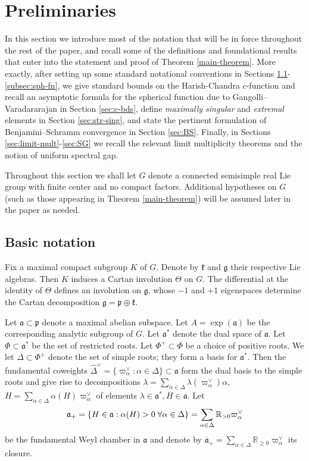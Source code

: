\documentclass[12pt]{amsart}
\theoremstyle{remark}
\newcommand{\R}{\mathbb R}
\newcommand{\g}{\mathfrak g}
\newcommand{\ga}{\mathfrak a}
\begin{document}
\section{Preliminaries}\label{sec:preliminaries}
In this section we introduce most of the notation that will be in force throughout the rest of the paper, and recall some of the definitions and foundational results that enter into the statement and proof of Theorem \ref{main-theorem}. More exactly, after setting up some standard notational conventions in Sections \ref{sec:basic}-\ref{subsec:sph-fn}, we give standard bounds on the Harish-Chandra $c$-function and recall an asymptotic formula for the spherical function due to Gangolli--Varadararajan in Section \ref{sec:c-bds}, define \textit{maximally singular} and \textit{extremal} elements in Section \ref{sec:str-sing}, and state the pertinent formulation of Benjamini--Schramm convergence in Section \ref{sec:BS}. Finally, in Sections \ref{sec:limit-mult}-\ref{sec:SG} we recall the relevant limit multiplicity theorems   and the notion of uniform spectral gap.

Throughout this section we shall let $G$ denote a connected semisimple real Lie group with finite center and no compact factors. Additional hypotheses on $G$ (such as those appearing in Theorem \ref{main-theorem}) will be assumed later in the paper as needed.

\subsection{Basic notation}\label{sec:basic}
Fix a maximal compact subgroup $K$ of $G$. Denote by $\mathfrak{k}$ and $\g$ their respective Lie algebras. Then $K$ induces a Cartan involution $\Theta$ on $G$. The differential at the identity of $\Theta$ defines an involution on $\g$, whose $-1$ and $+1$ eigenspaces determine the Cartan decomposition $\g=\mathfrak{p}\oplus\mathfrak{k}$.

Let $\mathfrak{a}\subset\mathfrak{p}$ denote a maximal abelian subspace. Let $A = \exp(\mathfrak{a})$ be the corresponding analytic subgroup of $G$. Let $\ga^*$ denote the dual space of $\ga$. Let $\Phi \subset\ga^*$ be the set of restricted roots. Let $\Phi^+\subset\Phi$ be a choice of positive roots. We let $\Delta\subset\Phi^+$ denote the set of simple roots; they form a basis for $\ga^*$. Then the fundamental coweights $\widehat{\Delta}^\vee=\{\varpi_\alpha^\vee : \alpha\in\Delta\}\subset\ga$ form the dual basis to the simple roots and give rise to decompositions
$\lambda=\sum_{\alpha\in\Delta} \lambda(\varpi_\alpha^\vee)\alpha$,  $H=\sum_{\alpha\in\Delta}\alpha(H)\varpi_\alpha^\vee$ of elements $\lambda\in\ga^*, H\in\ga$. Let
\[
\ga_+=\{H\in\ga: \alpha(H)>0\;\forall\alpha\in\Delta\}=\sum_{\alpha\in\Delta} \R_{> 0}\varpi_\alpha^\vee\\
\]
be the fundamental Weyl chamber in $\ga$ and denote by $\overline{\ga}_+=\sum_{\alpha\in\Delta} \R_{\ge 0}\varpi_\alpha^\vee$ its closure. 
\end{document}
